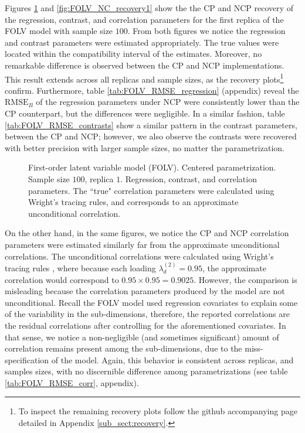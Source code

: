 Figures \ref{fig:FOLV_CE_recovery1} and \ref{fig:FOLV_NC_recovery1} show the the CP and NCP recovery of the regression, contrast, and correlation parameters for the first replica of the FOLV model with sample size $100$. From both figures we notice the regression and contrast parameters were estimated appropriately. The true values were located within the compatibility interval of the estimates. Moreover, no remarkable difference is observed between the CP and NCP implementations. This result extends across all replicas and sample sizes, as the recovery plots\footnote{To inspect the remaining recovery plots follow the github accompanying page detailed in Appendix \ref{sub_sect:recovery}.} confirm. Furthermore, table \ref{tab:FOLV_RMSE_regression} (appendix) reveal the $\text{RMSE}_{B}$ of the regression parameters under NCP were consistently lower than the CP counterpart, but the differences were negligible. In a similar fashion, table \ref{tab:FOLV_RMSE_contrasts} show a similar pattern in the contrast parameters, between the CP and NCP; however, we also observe the contrasts were recovered with better precision with larger sample sizes, no matter the parametrization.
%
\begin{figure}[H]
	\centering
	\begin{subfigure}
		\texttt{[image: FOLV\_CE\_J100\_Ndata1\_regression]}
	\end{subfigure}
	\begin{subfigure}
		\texttt{[image: FOLV\_CE\_J100\_Ndata1\_corr]}
	\end{subfigure}
	\caption[First-order latent variable model (FOLV). Centered parametrization. Sample size $100$, replica $1$. Regression, contrast, and correlation parameters.]%
	{First-order latent variable model (FOLV). Centered parametrization. Sample size $100$, replica $1$. Regression, contrast, and correlation parameters. The ``true" correlation parameters were calculated using Wright's tracing rules, and corresponds to an approximate unconditional correlation.}
	\label{fig:FOLV_CE_recovery1}
\end{figure}

On the other hand, in the same figures, we notice the CP and NCP correlation parameters were estimated similarly far from the approximate unconditional correlations. The unconditional correlations were calculated using Wright's tracing rules \cite{Beaujean_2014}, where because each loading $\lambda^{(2)}_{d} = 0.95$, the approximate correlation would correspond to $0.95 \times 0.95 = 0.9025$. However, the comparison is misleading because the correlation parameters produced by the model are not unconditional. Recall the FOLV model used regression covariates to explain some of the variability in the sub-dimensions, therefore, the reported correlations are the residual correlations after controlling for the aforementioned covariates. In that sense, we notice a non-negligible (and sometimes significant) amount of correlation remains present among the sub-dimensions, due to the miss-specification of the model. Again, this behavior is consistent across replicas, and samples sizes, with no discernible difference among parametrizations (see table \ref{tab:FOLV_RMSE_corr}, appendix).

